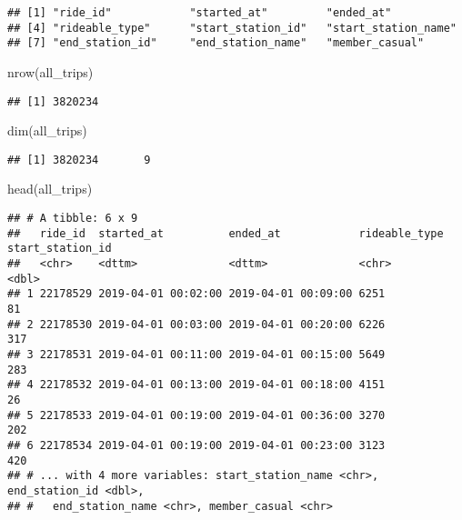 \documentclass[
]{article}
\newenvironment{Shaded}{\begin{snugshade}}{\end{snugshade}}
\newcommand{\FunctionTok}[1]{\textcolor[rgb]{0.00,0.00,0.00}{#1}}
\newcommand{\NormalTok}[1]{#1}
\begin{document}
\begin{verbatim}
## [1] "ride_id"            "started_at"         "ended_at"          
## [4] "rideable_type"      "start_station_id"   "start_station_name"
## [7] "end_station_id"     "end_station_name"   "member_casual"
\end{verbatim}

\begin{Shaded}
\begin{Highlighting}[]
\FunctionTok{nrow}\NormalTok{(all\_trips)}
\end{Highlighting}
\end{Shaded}

\begin{verbatim}
## [1] 3820234
\end{verbatim}

\begin{Shaded}
\begin{Highlighting}[]
\FunctionTok{dim}\NormalTok{(all\_trips)}
\end{Highlighting}
\end{Shaded}

\begin{verbatim}
## [1] 3820234       9
\end{verbatim}

\begin{Shaded}
\begin{Highlighting}[]
\FunctionTok{head}\NormalTok{(all\_trips)}
\end{Highlighting}
\end{Shaded}

\begin{verbatim}
## # A tibble: 6 x 9
##   ride_id  started_at          ended_at            rideable_type start_station_id
##   <chr>    <dttm>              <dttm>              <chr>                    <dbl>
## 1 22178529 2019-04-01 00:02:00 2019-04-01 00:09:00 6251                        81
## 2 22178530 2019-04-01 00:03:00 2019-04-01 00:20:00 6226                       317
## 3 22178531 2019-04-01 00:11:00 2019-04-01 00:15:00 5649                       283
## 4 22178532 2019-04-01 00:13:00 2019-04-01 00:18:00 4151                        26
## 5 22178533 2019-04-01 00:19:00 2019-04-01 00:36:00 3270                       202
## 6 22178534 2019-04-01 00:19:00 2019-04-01 00:23:00 3123                       420
## # ... with 4 more variables: start_station_name <chr>, end_station_id <dbl>,
## #   end_station_name <chr>, member_casual <chr>
\end{verbatim}
\end{document}
